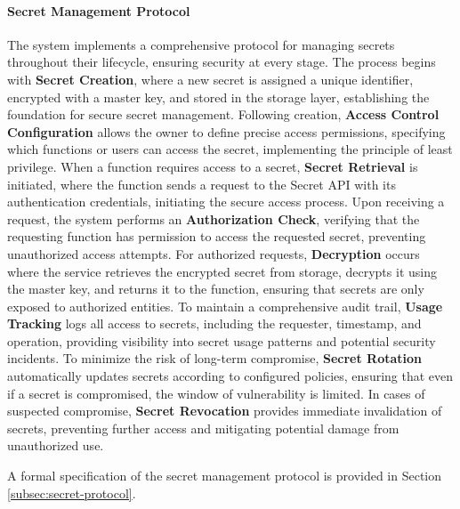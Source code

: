 \documentclass{article}
\begin{document}
\paragraph{Secret Management Protocol}
The system implements a comprehensive protocol for managing secrets throughout their lifecycle, ensuring security at every stage. The process begins with \textbf{Secret Creation}, where a new secret is assigned a unique identifier, encrypted with a master key, and stored in the storage layer, establishing the foundation for secure secret management. Following creation, \textbf{Access Control Configuration} allows the owner to define precise access permissions, specifying which functions or users can access the secret, implementing the principle of least privilege. When a function requires access to a secret, \textbf{Secret Retrieval} is initiated, where the function sends a request to the Secret API with its authentication credentials, initiating the secure access process. Upon receiving a request, the system performs an \textbf{Authorization Check}, verifying that the requesting function has permission to access the requested secret, preventing unauthorized access attempts. For authorized requests, \textbf{Decryption} occurs where the service retrieves the encrypted secret from storage, decrypts it using the master key, and returns it to the function, ensuring that secrets are only exposed to authorized entities. To maintain a comprehensive audit trail, \textbf{Usage Tracking} logs all access to secrets, including the requester, timestamp, and operation, providing visibility into secret usage patterns and potential security incidents. To minimize the risk of long-term compromise, \textbf{Secret Rotation} automatically updates secrets according to configured policies, ensuring that even if a secret is compromised, the window of vulnerability is limited. In cases of suspected compromise, \textbf{Secret Revocation} provides immediate invalidation of secrets, preventing further access and mitigating potential damage from unauthorized use.

A formal specification of the secret management protocol is provided in Section \ref{subsec:secret-protocol}.


\end{document}
